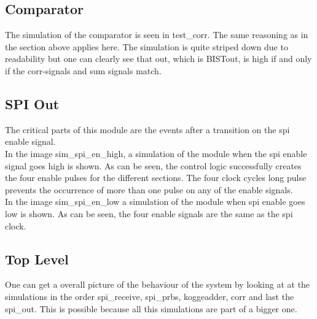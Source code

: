 \subsection{Comparator}
The simulation of the comparator is seen in test\_corr. The same reasoning as in the section above applies here. The simulation is quite striped down due to readability but one can clearly see that out, which is BISTout, is high if and only if the corr-signals and sum signals match.

\subsection{SPI Out}
The critical parts of this module are the events after a transition on the spi enable signal.\\


In the image sim\_spi\_en\_high, a simulation of the module when the spi enable signal goes high is shown. As can be seen, the control logic successfully creates the four enable pulses for the different sections. The four clock cycles long pulse prevents the occurrence of more than one pulse on any of the enable signals. \\





In the image sim\_spi\_en\_low a simulation of the module when spi enable goes low is shown. As can be seen, the four enable signals are the same as the spi clock.


\subsection{Top Level}
One can get a overall picture of the behaviour of the system by looking at at the simulations in the order spi\_receive, spi\_prbs, koggeadder, corr and last the spi\_out. This is possible because all this simulations are part of a bigger one.
